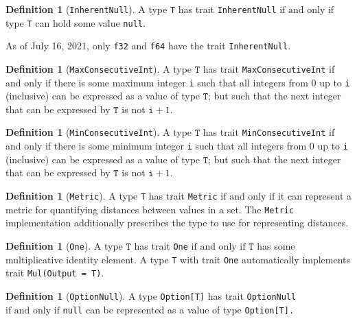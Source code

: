 \documentclass[11pt,a4paper]{article}
\theoremstyle{definition}
\newtheorem{definition}[theorem]{Definition}
\newcommand{\T}{\texttt{T}}
\newcommand{\iffText}{\text{if and only if}}
\begin{document}
\begin{definition}[\texttt{InherentNull}]
A type \texttt{T} has trait \texttt{InherentNull} $\iffText$ type \texttt{T} can hold some value \texttt{null}.

As of July 16, 2021, only \texttt{f32} and \texttt{f64} have the trait \texttt{InherentNull}.
\end{definition}


\begin{definition}[\texttt{MaxConsecutiveInt}]
A type $\T$ has trait \texttt{MaxConsecutiveInt} if and only if there is some maximum integer \texttt{i} such that all integers from 0 up to \texttt{i} (inclusive) can be expressed as a value of type $\T$; but such that the next integer that can be expressed by $\T$ is not $\texttt{i}+1$.
\end{definition}

\begin{definition}[\texttt{MinConsecutiveInt}]
A type $\T$ has trait \texttt{MinConsecutiveInt} if and only if there is some minimum integer \texttt{i} such that all integers from 0 up to \texttt{i} (inclusive) can be expressed as a value of type $\T$; but such that the next integer that can be expressed by $\T$ is not $\texttt{i}+1$.
\end{definition}

\begin{definition}[\texttt{Metric}]
A type \texttt{T} has trait \texttt{Metric} $\iffText$ it can represent a metric for quantifying distances between values in a set. The \texttt{Metric} implementation additionally prescribes the type to use for representing distances.
\end{definition}

\begin{definition}[\texttt{One}]
    A type $\T$ has trait \texttt{One} $\iffText$ $\T$ has some multiplicative identity element. A type \texttt{T} with trait \texttt{One} automatically implements trait \texttt{Mul(Output = T)}.
\end{definition}

\begin{definition}[\texttt{OptionNull}]
A type \texttt{Option[T]} has trait \texttt{OptionNull} $\iffText$ \texttt{null} can be represented as a value of type \texttt{Option[T].}
\end{definition}
\end{document}
